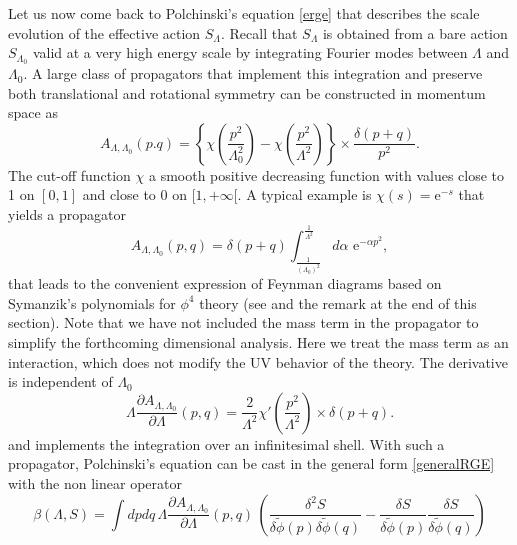 \documentclass[12pt,here,feynmf]{article}
\begin{document}
Let us now come back to Polchinski's equation \eqref{erge} that describes the scale evolution of the effective action $S_{\Lambda}$. Recall that $S_{\Lambda}$ is obtained from a bare action $S_{\Lambda_{0}}$ valid at a very high energy scale by integrating Fourier modes between $\Lambda$ and $\Lambda_{0}$. A large class of propagators that implement this integration and preserve both translational and rotational symmetry can be constructed in momentum space as
\begin{equation}    
A_{\Lambda,\Lambda_{0}}(p.q)=
\left\{\chi\left(\frac{p^{2}}{\Lambda_{0}^{2}}\right)-\chi\left(\frac{p^{2}}{\Lambda^{2}}\right)\right\}
\times\frac{\delta(p+q)}{p^{2}}.
\end{equation}
The cut-off function $\chi$ a smooth positive decreasing function with values close to 1 on $[0,1]$ and close to 0 on $[1,+\infty[$. A typical example is $\chi(s)=\mathrm{e}^{-s}$ that yields a propagator 
\begin{equation}
A_{\Lambda,\Lambda_{0}}(p,q)=\delta(p+q)\int^{\frac{1}{\Lambda^{2}}}_{\frac{1}{(\Lambda_{0})^{2}}}\!\!d\alpha\,\,\mathrm{e}^{-\alpha p^{2}},
\end{equation}
that leads to the convenient expression of Feynman diagrams based on Symanzik's polynomials for $\phi^{4}$ theory (see \cite{Rivasseau} and the remark at the end of this section). Note that we have not included the mass term in the propagator to simplify the forthcoming dimensional analysis. Here we treat the mass term as an interaction, which does not modify the UV behavior of the theory.  The derivative is independent of $\Lambda_{0}$
\begin{equation}
\Lambda\frac{\partial A_{\Lambda,\Lambda_{0}}}{\partial\Lambda}(p,q)=
\frac{2}{\Lambda^{2}}\chi'\left(\frac{p^{2}}{\Lambda^{2}}\right)
\times\delta(p+q).
\end{equation}
and implements the integration over an infinitesimal shell.  With such a propagator, Polchinski's equation can be cast in the general form \eqref{generalRGE} with the non linear operator
\begin{equation}
\beta(\Lambda,S)=\int dpdq\,\Lambda\frac{\partial A_{\Lambda,\Lambda_{0}}}{\partial\Lambda}(p,q)\,
\left(
\frac{\delta^{2}S}{\delta\widetilde{\phi}(p)\delta\widetilde{\phi}(q)}- \frac{\delta
S}{\delta\widetilde{\phi}(p)} \frac{\delta S}{\delta\widetilde{\phi}(q)} \right)
\end{equation}
\end{document}
